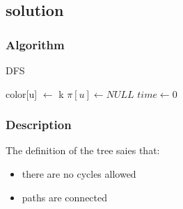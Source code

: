 \subsection{solution}

\subsubsection{Algorithm}
\begin{algorithm}[h]
\small
\caption{DFS}

\begin{algorithmic}
       \STATE color[u] $\gets$ k
       \STATE $\pi[u] \gets NULL$
    \ENDFOR
    \STATE $time \gets 0$
\end{algorithmic}
\end{algorithm}
% 
% 


\subsubsection{Description}
The definition of the tree saies that:
\begin{itemize}
 \item there are no cycles allowed
 \item paths are connected
\end{itemize}
